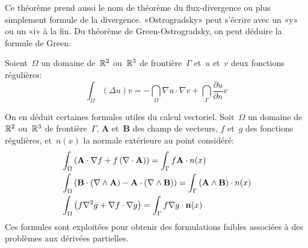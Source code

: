 \medskip
Ce théorème prend aussi le nom de théorème du flux-divergence ou plus simplement formule de la divergence. «Ostrogradsky» peut s'écrire avec un «y» ou un «i» à la fin. Du théorème de Green-Ostrogradsky, on peut déduire la formule de Green:

\begin{theoreme}
Soient~$\Omega$ un domaine de~$\mathbb R^2$ ou~$\mathbb R^3$ de frontière~$\Gamma$ et~$u$ et~$v$ deux fonctions régulières:
\begin{equation}
\int_\Omega (\Delta u)v = -\dint_\Omega \nabla u\cdot\nabla v + \dint_\Gamma \dfrac{\partial u}{\partial n}v
\end{equation}
\end{theoreme}

\medskip
On en déduit certaines formules utiles du calcul vectoriel.
Soit~$\Omega$ un domaine de~$\mathbb R^2$ ou~$\mathbb R^3$ de frontière~$\Gamma$, $\mathbf{A}$ et~$\mathbf{B}$ des champ de vecteurs, $f$ et~$g$ des fonctions régulières, et~$n(x)$ la normale extérieure au point considéré:
\begin{align}
  &\int_\Omega \left( \mathbf{A}\cdot \nabla f + f \left(\nabla \cdot \mathbf{A}\right)\right)=
  \int_\Gamma f \mathbf{A}\cdot n(x)\\
&\int_\Omega \left( \mathbf{B}\cdot\left(\nabla \wedge \mathbf{A}\right) - \mathbf{A}\cdot \left(\nabla
\wedge \mathbf{B}\right) \right)
= \int_\Gamma \left(\mathbf{A} \wedge \mathbf{B}\right)\cdot n(x)\\
&\int_\Omega \left( f \nabla^{2} g + \nabla f \cdot \nabla g \right)
= \int_\Gamma f \nabla g \cdot \mathbf{n}(x)
\end{align}
Ces formules sont exploitées pour obtenir des formulations faibles associées à des problèmes aux dérivées partielles. 
